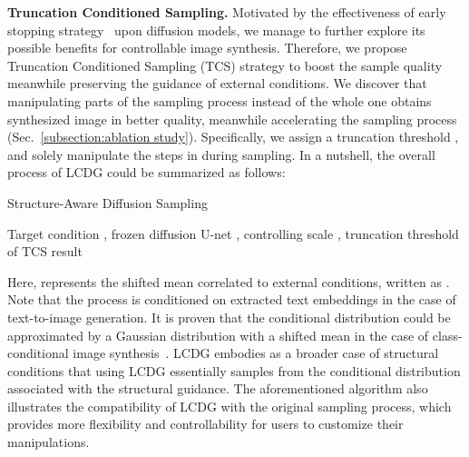 \documentclass{article}
\begin{document}
\textbf{Truncation Conditioned Sampling.} Motivated by the effectiveness of early stopping strategy~\cite{lyu2022accelerating} upon diffusion models, we manage to further explore its possible benefits for controllable image synthesis. Therefore, we propose Truncation Conditioned Sampling (TCS) strategy to boost the sample quality meanwhile preserving the guidance of external conditions. We discover that manipulating parts of the sampling process instead of the whole one obtains 
synthesized image in better quality, meanwhile accelerating the sampling process (Sec.~\ref{subsection:ablation study}). Specifically, we assign a truncation threshold , and solely manipulate the steps in  during sampling. In a nutshell, the overall process of LCDG could be summarized as follows:
\vspace{-0.5em}
\begin{algorithm}[H]
\renewcommand{\algorithmicrequire}{\textbf{Input:}}
    \renewcommand{\algorithmicensure}{\textbf{Output:}}
    \caption{Structure-Aware Diffusion Sampling}
    \begin{algorithmic}
    \label{algorithm: LCDG sampling}
        \Require Target condition , frozen diffusion U-net , controlling scale , truncation threshold of TCS 
        \Ensure result 
        \State 
        \State 
        \For {} \textcolor{blue}{}
        \State \qquad 
        \EndFor
        \For {} \textcolor{blue}{}
        \State \qquad 
        \EndFor\\
        \Return 
    \end{algorithmic}
\end{algorithm}
\vspace{-1em}
Here,  represents the shifted mean correlated to external conditions, written as . Note that the process is conditioned on extracted text embeddings  in the case of text-to-image generation. It is proven that the conditional distribution could be approximated by a Gaussian distribution with a shifted mean in the case of class-conditional image synthesis~\cite{dhariwal2021diffusion}. LCDG embodies as a broader case of structural conditions that using LCDG essentially samples from the conditional distribution associated with the structural guidance. The aforementioned algorithm also 
illustrates the compatibility of LCDG with the original sampling process, which provides more flexibility and controllability for users to customize their manipulations. 
\end{document}
